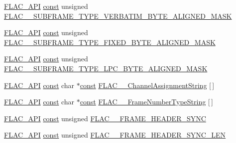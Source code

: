 \begin{DoxyCompactItemize}
\item 
\hyperlink{group__flac__export_ga56ca07df8a23310707732b1c0007d6f5}{F\+L\+A\+C\+\_\+\+A\+PI} \hyperlink{zconf_8h_a2c212835823e3c54a8ab6d95c652660e}{const} unsigned \hyperlink{group__flac__format_ga5855173f9bc3584b545b04cf6ba8f8f8}{F\+L\+A\+C\+\_\+\+\_\+\+S\+U\+B\+F\+R\+A\+M\+E\+\_\+\+T\+Y\+P\+E\+\_\+\+V\+E\+R\+B\+A\+T\+I\+M\+\_\+\+B\+Y\+T\+E\+\_\+\+A\+L\+I\+G\+N\+E\+D\+\_\+\+M\+A\+SK}
\item 
\hyperlink{group__flac__export_ga56ca07df8a23310707732b1c0007d6f5}{F\+L\+A\+C\+\_\+\+A\+PI} \hyperlink{zconf_8h_a2c212835823e3c54a8ab6d95c652660e}{const} unsigned \hyperlink{group__flac__format_gaf4ae885d07037bbcb46fb199f5f4d3a9}{F\+L\+A\+C\+\_\+\+\_\+\+S\+U\+B\+F\+R\+A\+M\+E\+\_\+\+T\+Y\+P\+E\+\_\+\+F\+I\+X\+E\+D\+\_\+\+B\+Y\+T\+E\+\_\+\+A\+L\+I\+G\+N\+E\+D\+\_\+\+M\+A\+SK}
\item 
\hyperlink{group__flac__export_ga56ca07df8a23310707732b1c0007d6f5}{F\+L\+A\+C\+\_\+\+A\+PI} \hyperlink{zconf_8h_a2c212835823e3c54a8ab6d95c652660e}{const} unsigned \hyperlink{group__flac__format_gac5ee2d30e02fe8a3a2fe5417e1200434}{F\+L\+A\+C\+\_\+\+\_\+\+S\+U\+B\+F\+R\+A\+M\+E\+\_\+\+T\+Y\+P\+E\+\_\+\+L\+P\+C\+\_\+\+B\+Y\+T\+E\+\_\+\+A\+L\+I\+G\+N\+E\+D\+\_\+\+M\+A\+SK}
\item 
\hyperlink{group__flac__export_ga56ca07df8a23310707732b1c0007d6f5}{F\+L\+A\+C\+\_\+\+A\+PI} \hyperlink{zconf_8h_a2c212835823e3c54a8ab6d95c652660e}{const} char $\ast$\hyperlink{zconf_8h_a2c212835823e3c54a8ab6d95c652660e}{const} \hyperlink{group__flac__format_ga56e0484fe205ab9f699ba5413c8441a1}{F\+L\+A\+C\+\_\+\+\_\+\+Channel\+Assignment\+String} \mbox{[}$\,$\mbox{]}
\item 
\hyperlink{group__flac__export_ga56ca07df8a23310707732b1c0007d6f5}{F\+L\+A\+C\+\_\+\+A\+PI} \hyperlink{zconf_8h_a2c212835823e3c54a8ab6d95c652660e}{const} char $\ast$\hyperlink{zconf_8h_a2c212835823e3c54a8ab6d95c652660e}{const} \hyperlink{group__flac__format_ga79fbcf4b5c8dd457f83782479fe01222}{F\+L\+A\+C\+\_\+\+\_\+\+Frame\+Number\+Type\+String} \mbox{[}$\,$\mbox{]}
\item 
\hyperlink{group__flac__export_ga56ca07df8a23310707732b1c0007d6f5}{F\+L\+A\+C\+\_\+\+A\+PI} \hyperlink{zconf_8h_a2c212835823e3c54a8ab6d95c652660e}{const} unsigned \hyperlink{group__flac__format_gaf8a0d3e8d4b884184d9c3989480748e9}{F\+L\+A\+C\+\_\+\+\_\+\+F\+R\+A\+M\+E\+\_\+\+H\+E\+A\+D\+E\+R\+\_\+\+S\+Y\+NC}
\item 
\hyperlink{group__flac__export_ga56ca07df8a23310707732b1c0007d6f5}{F\+L\+A\+C\+\_\+\+A\+PI} \hyperlink{zconf_8h_a2c212835823e3c54a8ab6d95c652660e}{const} unsigned \hyperlink{group__flac__format_gaf8b98ef56e49b221414aadbea5baaaf0}{F\+L\+A\+C\+\_\+\+\_\+\+F\+R\+A\+M\+E\+\_\+\+H\+E\+A\+D\+E\+R\+\_\+\+S\+Y\+N\+C\+\_\+\+L\+EN}

\end{DoxyCompactItemize}
